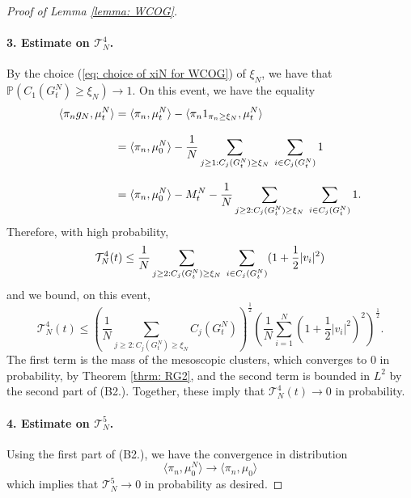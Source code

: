 \begin{proof}[Proof of Lemma \ref{lemma: WCOG}]
\paragraph{3. Estimate on $\mathcal{T}^4_N$.} By the choice (\ref{eq: choice of xiN for WCOG}) of $\xi_N$, we have that $\mathbb{P}( C_1(G^N_t)\geq \xi_N)\rightarrow 1.$ On this event, we have the equality \begin{equation}
           \begin{split}
               \langle \pi_n g_N, \mu^N_t\rangle &=\langle \pi_n, \mu^N_t\rangle - \langle \pi_n 1_{\pi_n\geq \xi_N}, \mu^N_t\rangle \\[2ex] & = \langle \pi_n, \mu^N_0\rangle-\frac{1}{N}\sum_{j\geq 1: C_j(G^N_t)\ge \xi_N} \hspace{0.1cm}\sum_{i \in C_j(G^N_t)} 1 \\[2ex] & = \langle \pi_n, \mu^N_0\rangle-M^N_t-\frac{1}{N}\sum_{j\ge 2:C_j(G^N_t)\ge \xi_N}\hspace{0.1cm}\sum_{i\in C_j(G^N_t)}1. 
           \end{split} 
       \end{equation} Therefore, with high probability, \begin{equation}\label{eq: bound on T4} \mathcal{T}^4_N(t) \le \frac{1}{N} \sum_{j\ge 2:C_j(G^N_t)\ge \xi_N} \hspace{0.1cm}\sum_{i\in C_j(G^N_t)} (1+\frac{1}{2}|v_i|^2) \end{equation} and we bound, on this event, \begin{equation}\mathcal{T}^4_N(t) \le \left(\frac{1}{N}\sum_{j\ge 2: C_j(G^N_t)\ge \xi_N} C_j(G^N_t)\right)^\frac{1}{2}\left(\frac{1}{N}\sum_{i=1}^N (1+\frac{1}{2}|v_i|^2)^2\right)^\frac{1}{2}. \end{equation} The first term is the mass of the mesoscopic clusters, which converges to $0$ in probability, by Theorem \ref{thrm: RG2}, and the second term is bounded in $L^2$ by the second part of (B2.). Together, these imply that $\mathcal{T}^4_N(t)\rightarrow 0$ in probability.
 \paragraph{4. Estimate on $\mathcal{T}^5_N$.} Using the first part of (B2.), we have the convergence in distribution \begin{equation} \langle \pi_n, \mu^N_0\rangle \rightarrow \langle \pi_n, \mu_0\rangle \end{equation} which implies that $\mathcal{T}^5_N\rightarrow 0$ in probability as desired. 

\end{proof}
